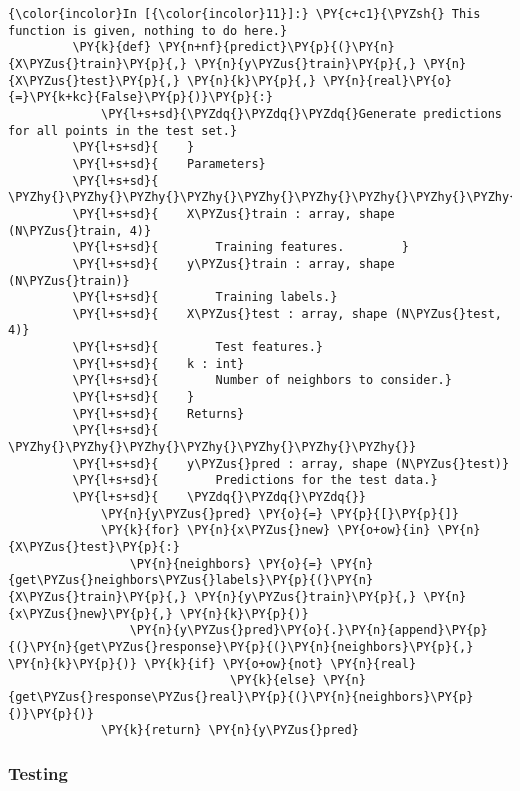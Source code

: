     \begin{Verbatim}[commandchars=\\\{\}]
{\color{incolor}In [{\color{incolor}11}]:} \PY{c+c1}{\PYZsh{} This function is given, nothing to do here.}
         \PY{k}{def} \PY{n+nf}{predict}\PY{p}{(}\PY{n}{X\PYZus{}train}\PY{p}{,} \PY{n}{y\PYZus{}train}\PY{p}{,} \PY{n}{X\PYZus{}test}\PY{p}{,} \PY{n}{k}\PY{p}{,} \PY{n}{real}\PY{o}{=}\PY{k+kc}{False}\PY{p}{)}\PY{p}{:}
             \PY{l+s+sd}{\PYZdq{}\PYZdq{}\PYZdq{}Generate predictions for all points in the test set.}
         \PY{l+s+sd}{    }
         \PY{l+s+sd}{    Parameters}
         \PY{l+s+sd}{    \PYZhy{}\PYZhy{}\PYZhy{}\PYZhy{}\PYZhy{}\PYZhy{}\PYZhy{}\PYZhy{}\PYZhy{}\PYZhy{}}
         \PY{l+s+sd}{    X\PYZus{}train : array, shape (N\PYZus{}train, 4)}
         \PY{l+s+sd}{        Training features.        }
         \PY{l+s+sd}{    y\PYZus{}train : array, shape (N\PYZus{}train)}
         \PY{l+s+sd}{        Training labels.}
         \PY{l+s+sd}{    X\PYZus{}test : array, shape (N\PYZus{}test, 4)}
         \PY{l+s+sd}{        Test features.}
         \PY{l+s+sd}{    k : int}
         \PY{l+s+sd}{        Number of neighbors to consider.}
         \PY{l+s+sd}{    }
         \PY{l+s+sd}{    Returns}
         \PY{l+s+sd}{    \PYZhy{}\PYZhy{}\PYZhy{}\PYZhy{}\PYZhy{}\PYZhy{}\PYZhy{}}
         \PY{l+s+sd}{    y\PYZus{}pred : array, shape (N\PYZus{}test)}
         \PY{l+s+sd}{        Predictions for the test data.}
         \PY{l+s+sd}{    \PYZdq{}\PYZdq{}\PYZdq{}}
             \PY{n}{y\PYZus{}pred} \PY{o}{=} \PY{p}{[}\PY{p}{]}
             \PY{k}{for} \PY{n}{x\PYZus{}new} \PY{o+ow}{in} \PY{n}{X\PYZus{}test}\PY{p}{:}
                 \PY{n}{neighbors} \PY{o}{=} \PY{n}{get\PYZus{}neighbors\PYZus{}labels}\PY{p}{(}\PY{n}{X\PYZus{}train}\PY{p}{,} \PY{n}{y\PYZus{}train}\PY{p}{,} \PY{n}{x\PYZus{}new}\PY{p}{,} \PY{n}{k}\PY{p}{)}
                 \PY{n}{y\PYZus{}pred}\PY{o}{.}\PY{n}{append}\PY{p}{(}\PY{n}{get\PYZus{}response}\PY{p}{(}\PY{n}{neighbors}\PY{p}{,} \PY{n}{k}\PY{p}{)} \PY{k}{if} \PY{o+ow}{not} \PY{n}{real}
                               \PY{k}{else} \PY{n}{get\PYZus{}response\PYZus{}real}\PY{p}{(}\PY{n}{neighbors}\PY{p}{)}\PY{p}{)}
             \PY{k}{return} \PY{n}{y\PYZus{}pred}
\end{Verbatim}

    \hypertarget{testing}{%
\subsubsection{Testing}\label{testing}}

